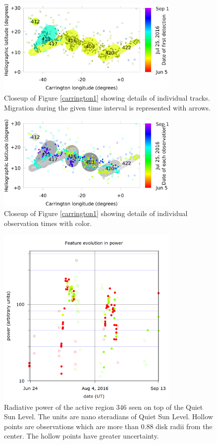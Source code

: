 \documentclass{aa}
\begin{document}
\begin{figure}
\centering
\includegraphics[width=8.8cm]{carrington2.png}
\caption{Closeup of Figure \ref{carrington1} showing details of individual tracks. Migration during the given time interval is represented with arrows.}
\label{carrington2}
\end{figure}


\begin{figure}
\centering
\includegraphics[width=8.8cm]{carrington3.png}
\caption{Closeup of Figure \ref{carrington1} showing details of individual observation times with color.}
\label{carrington3}
\end{figure}

\begin{figure} \centering \includegraphics[width=8.8cm]{view_power_complex346.png}
\caption{Radiative power of the active region 346 seen on top of the Quiet Sun Level. The units are nano steradians of Quiet Sun Level. Hollow points are observations which are more than $0.88$ disk radii from the center. The hollow points have greater uncertainty.}
\label{complexpower} \end{figure}
\end{document}
